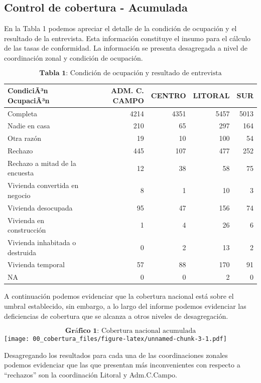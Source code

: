 \documentclass[
]{article}
\begin{document}
\textcolor{trueblue}{\section{Control de cobertura - Acumulada}}

En la Tabla 1 podemos apreciar el detalle de la condición de ocupación y
el resultado de la entrevista. Esta información constituye el insumo
para el cálculo de las tasas de conformidad. La información se presenta
desagregada a nivel de coordinación zonal y condición de ocupación.

\[\textbf{Tabla 1:}\text{ Condición de ocupación y resultado de entrevista}\]
\vspace{-8truemm}

\begin{longtable}[]{@{}lrrrr@{}}
\toprule
CondiciÃ³n OcupaciÃ³n & ADM. C. CAMPO & CENTRO & LITORAL & SUR \\
\midrule
\endhead
Completa & 4214 & 4351 & 5457 & 5013 \\
Nadie en casa & 210 & 65 & 297 & 164 \\
Otra razón & 19 & 10 & 100 & 54 \\
Rechazo & 445 & 107 & 477 & 252 \\
Rechazo a mitad de la encuesta & 12 & 38 & 58 & 75 \\
Vivienda convertida en negocio & 8 & 1 & 10 & 3 \\
Vivienda desocupada & 95 & 47 & 156 & 74 \\
Vivienda en construcción & 1 & 4 & 26 & 6 \\
Vivienda inhabitada o destruida & 0 & 2 & 13 & 2 \\
Vivienda temporal & 57 & 88 & 170 & 91 \\
NA & 0 & 0 & 2 & 0 \\
\bottomrule
\end{longtable}

\vspace{-1truemm}

A continuación podemos evidenciar que la cobertura nacional está sobre
el umbral establecido, sin embargo, a lo largo del informe podemos
evidenciar las deficiencias de cobertura que se alcanza a otros niveles
de desagregación.

\[\textbf{Gráfico 1:}\text{ Cobertura nacional acumulada}\]
\texttt{[image: 00\_cobertura\_files/figure-latex/unnamed-chunk-3-1.pdf]}

Desagregando los resultados para cada una de las coordinaciones zonales
podemos evidenciar que las que presentan más inconvenientes con respecto
a ``rechazos'' son la coordinación Litoral y Adm.C.Campo.
\end{document}
